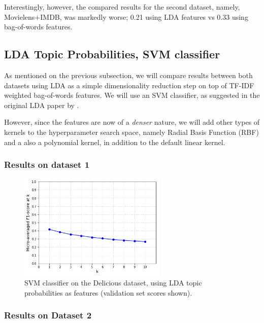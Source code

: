 Interestingly, however, the compared results for the second dataset, namely, Movielens+IMDB, was markedly worse; 0.21 using LDA features vs 0.33 using bag-of-words features.

\subsection{LDA Topic Probabilities, SVM classifier}

As mentioned on the previous subsection, we will compare results between both datasets using LDA as a simple dimensionality reduction step on top of TF-IDF weighted bag-of-words features. We will use an SVM classifier, as suggested in the original LDA paper by \cite{blei_etal_2003}.

However, since the features are now of a \textit{denser} nature, we will add other types of kernels to the hyperparameter search space, namely Radial Basis Function (RBF) and a also a polynomial kernel, in addition to the default linear kernel.

\subsubsection{Results on dataset 1}

\begin{figure}[H]
    \centering
    \includegraphics[width=7cm]{chapters/05_experiments/images/svm-lda-delicious.png}
    \caption{SVM classifier on the Delicious dataset, using LDA topic probabilities as features (validation set scores shown).}
    \label{fig:svm_lda_delicious}
\end{figure}

\subsubsection{Results on Dataset 2}

